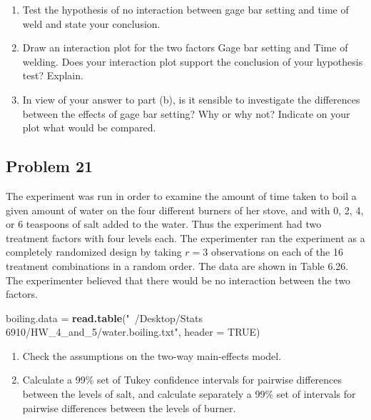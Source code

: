 \documentclass[12pt,]{article}
\newenvironment{Shaded}{\begin{snugshade}}{\end{snugshade}}
\newcommand{\KeywordTok}[1]{\textcolor[rgb]{0.13,0.29,0.53}{\textbf{#1}}}
\newcommand{\DataTypeTok}[1]{\textcolor[rgb]{0.13,0.29,0.53}{#1}}
\newcommand{\StringTok}[1]{\textcolor[rgb]{0.31,0.60,0.02}{#1}}
\newcommand{\OtherTok}[1]{\textcolor[rgb]{0.56,0.35,0.01}{#1}}
\newcommand{\NormalTok}[1]{#1}
\begin{document}
\begin{enumerate}
\def\labelenumi{(\alph{enumi})}
\item
  Test the hypothesis of no interaction between gage bar setting and
  time of weld and state your conclusion.
\item
  Draw an interaction plot for the two factors Gage bar setting and Time
  of welding. Does your interaction plot support the conclusion of your
  hypothesis test? Explain.
\item
  In view of your answer to part (b), is it sensible to investigate the
  differences between the effects of gage bar setting? Why or why not?
  Indicate on your plot what would be compared.
\end{enumerate}

\subsection{Problem 21}\label{problem-21}

The experiment was run in order to examine the amount of time taken to
boil a given amount of water on the four different burners of her stove,
and with 0, 2, 4, or 6 teaspoons of salt added to the water. Thus the
experiment had two treatment factors with four levels each. The
experimenter ran the experiment as a completely randomized design by
taking \(r = 3\) observations on each of the 16 treatment combinations
in a random order. The data are shown in Table 6.26. The experimenter
believed that there would be no interaction between the two factors.

\begin{Shaded}
\begin{Highlighting}[]
\NormalTok{boiling.data =}\StringTok{ }\KeywordTok{read.table}\NormalTok{(}\StringTok{"~/Desktop/Stats 6910/HW_4_and_5/water.boiling.txt"}\NormalTok{, }
                            \DataTypeTok{header =} \OtherTok{TRUE}\NormalTok{)}
\end{Highlighting}
\end{Shaded}

\begin{enumerate}
\def\labelenumi{(\alph{enumi})}
\item
  Check the assumptions on the two-way main-effects model.
\item
  Calculate a 99\% set of Tukey confidence intervals for pairwise
  differences between the levels of salt, and calculate separately a
  99\% set of intervals for pairwise differences between the levels of
  burner.
\end{enumerate}
\end{document}
